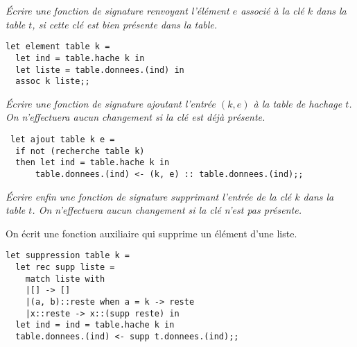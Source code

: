 \begin{Exercise}\it
Écrire une fonction  de signature  renvoyant l’élément $e$ associé à la clé
$k$ dans la table $t$, si cette clé est bien présente dans la table.
\end{Exercise}
\begin{Answer}
\begin{lstlisting}
let element table k =
  let ind = table.hache k in
  let liste = table.donnees.(ind) in
  assoc k liste;;
\end{lstlisting}
\end{Answer}

\begin{Exercise}\it
Écrire une fonction  de signature  ajoutant l’entrée $(k, e)$ à la
table de hachage $t$. On n’effectuera aucun changement si la clé est
déjà présente.
\end{Exercise}
\begin{Answer}
\begin{lstlisting}
 let ajout table k e =
  if not (recherche table k) 
  then let ind = table.hache k in
      table.donnees.(ind) <- (k, e) :: table.donnees.(ind);;
\end{lstlisting}
\end{Answer}

\begin{Exercise}\it
Écrire enfin une fonction  de signature  supprimant l’entrée de la clé $k$
dans la table $t$. On n’effectuera aucun changement si la clé n’est pas
présente.
\end{Exercise}
\begin{Answer}
On écrit une fonction auxiliaire qui supprime un élément d'une liste.
\begin{lstlisting}
let suppression table k =
  let rec supp liste = 
    match liste with
    |[] -> []
    |(a, b)::reste when a = k -> reste
    |x::reste -> x::(supp reste) in
  let ind = ind = table.hache k in
  table.donnees.(ind) <- supp t.donnees.(ind);;
\end{lstlisting}
\end{Answer}
